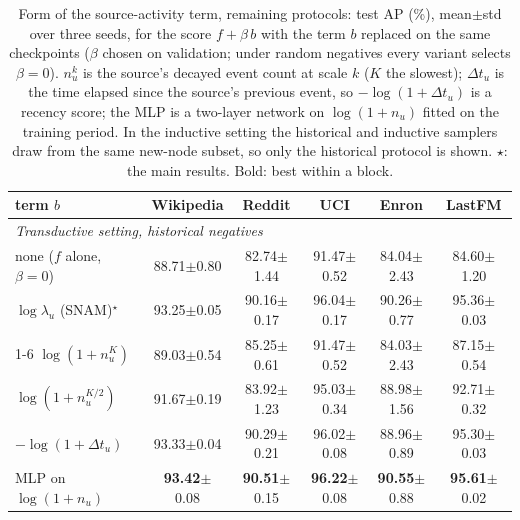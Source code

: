 \begin{table}[t]
\caption{Form of the source-activity term, remaining protocols: test AP (\%), mean{\scriptsize$\pm$std} over three seeds, for the score $f+\beta\,b$ with the term $b$ replaced on the same checkpoints ($\beta$ chosen on validation; under random negatives every variant selects $\beta=0$). $n_u^k$ is the source's decayed event count at scale $k$ ($K$ the slowest); $\Delta t_u$ is the time elapsed since the source's previous event, so $-\log(1+\Delta t_u)$ is a recency score; the MLP is a two-layer network on $\log(1+n_u)$ fitted on the training period. In the inductive setting the historical and inductive samplers draw from the same new-node subset, so only the historical protocol is shown. $\star$: the main results. Bold: best within a block.}
\label{tab:a3_appendix}
\centering
\footnotesize
\setlength{\tabcolsep}{3pt}
\renewcommand{\arraystretch}{0.92}
\begin{tabular}{lccccc}
\toprule
term $b$ & Wikipedia & Reddit & UCI & Enron & LastFM \\
\midrule
\multicolumn{6}{l}{\textit{Transductive setting, historical negatives}} \\
\midrule
none ($f$ alone, $\beta=0$) & 88.71{\scriptsize$\pm$0.80} & 82.74{\scriptsize$\pm$1.44} & 91.47{\scriptsize$\pm$0.52} & 84.04{\scriptsize$\pm$2.43} & 84.60{\scriptsize$\pm$1.20} \\
$\log\lambda_u$ (SNAM)$^\star$ & 93.25{\scriptsize$\pm$0.05} & 90.16{\scriptsize$\pm$0.17} & 96.04{\scriptsize$\pm$0.17} & 90.26{\scriptsize$\pm$0.77} & 95.36{\scriptsize$\pm$0.03} \\
\cmidrule(lr){1-6}
$\log(1+n_u^{K})$ & 89.03{\scriptsize$\pm$0.54} & 85.25{\scriptsize$\pm$0.61} & 91.47{\scriptsize$\pm$0.52} & 84.03{\scriptsize$\pm$2.43} & 87.15{\scriptsize$\pm$0.54} \\
$\log(1+n_u^{K/2})$ & 91.67{\scriptsize$\pm$0.19} & 83.92{\scriptsize$\pm$1.23} & 95.03{\scriptsize$\pm$0.34} & 88.98{\scriptsize$\pm$1.56} & 92.71{\scriptsize$\pm$0.32} \\
$-\log(1+\Delta t_u)$ & 93.33{\scriptsize$\pm$0.04} & 90.29{\scriptsize$\pm$0.21} & 96.02{\scriptsize$\pm$0.08} & 88.96{\scriptsize$\pm$0.89} & 95.30{\scriptsize$\pm$0.03} \\
MLP on $\log(1+n_u)$ & \textbf{93.42}{\scriptsize$\pm$0.08} & \textbf{90.51}{\scriptsize$\pm$0.15} & \textbf{96.22}{\scriptsize$\pm$0.08} & \textbf{90.55}{\scriptsize$\pm$0.88} & \textbf{95.61}{\scriptsize$\pm$0.02} \\

\end{tabular}
\end{table}
